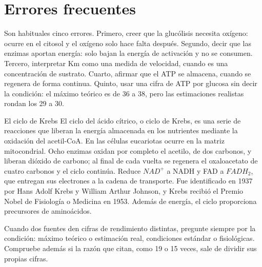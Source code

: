 \documentclass{book}
\begin{document}

\section{Errores frecuentes}

Son habituales cinco errores. Primero, creer que la glucólisis necesita oxígeno: ocurre en el citosol y el oxígeno solo hace falta después. Segundo, decir que las enzimas aportan energía: solo bajan la energía de activación y no se consumen. Tercero, interpretar Km como una medida de velocidad, cuando es una concentración de sustrato. Cuarto, afirmar que el ATP se almacena, cuando se regenera de forma continua. Quinto, usar una cifra de ATP por glucosa sin decir la condición: el máximo teórico es de 36 a 38, pero las estimaciones realistas rondan los 29 a 30.


\begin{tcolorbox}[title={Consejo}, studiumtip, breakable]

El ciclo de Krebs
El ciclo del ácido cítrico, o ciclo de Krebs, es una serie de reacciones que liberan la energía almacenada en los nutrientes mediante la oxidación del acetil-CoA. En las células eucariotas ocurre en la matriz mitocondrial. Ocho enzimas oxidan por completo el acetilo, de dos carbonos, y liberan dióxido de carbono; al final de cada vuelta se regenera el oxaloacetato de cuatro carbonos y el ciclo continúa. Reduce \(NAD^{+}\) a NADH y FAD a \(FADH_{2}\), que entregan sus electrones a la cadena de transporte. Fue identificado en 1937 por Hans Adolf Krebs y William Arthur Johnson, y Krebs recibió el Premio Nobel de Fisiología o Medicina en 1953. Además de energía, el ciclo proporciona precursores de aminoácidos.


Cuando dos fuentes den cifras de rendimiento distintas, pregunte siempre por la condición: máximo teórico o estimación real, condiciones estándar o fisiológicas. Compruebe además si la razón que citan, como 19 o 15 veces, sale de dividir sus propias cifras.

\end{tcolorbox}
\end{document}

